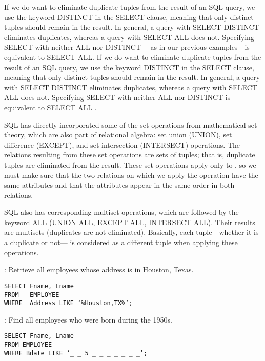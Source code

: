     \par If we do want to eliminate duplicate tuples from the result of an SQL query, we use the keyword DISTINCT in the SELECT clause, meaning that only distinct tuples should remain in the result. In general, a query with SELECT DISTINCT eliminates duplicates, whereas a query with SELECT ALL does not. Specifying SELECT with neither ALL nor DISTINCT —as in our previous examples—is equivalent to SELECT ALL. If we do want to eliminate duplicate tuples from the result of an SQL query, we use the keyword DISTINCT in the SELECT clause, meaning that only distinct tuples should remain in the result. In general, a query with SELECT DISTINCT eliminates duplicates, whereas a query with SELECT ALL does not. Specifying SELECT with neither ALL nor DISTINCT is
equivalent to SELECT ALL .
    \par SQL has directly incorporated some of the set operations from mathematical set
theory, which are also part of relational algebra: set union (UNION), set difference (EXCEPT), and set intersection (INTERSECT) operations. The relations resulting from these set operations are sets of tuples; that is, duplicate tuples are eliminated from the result. These set operations apply only to , so we must make sure that the two relations on which we apply the operation have the same attributes and that the attributes appear in the same order in both relations.
  \par SQL also has corresponding multiset operations, which are followed by the keyword ALL (UNION ALL, EXCEPT ALL, INTERSECT ALL). Their results are multisets (duplicates are not eliminated). Basically, each tuple—whether it is a duplicate or not— is considered as a different tuple when applying these operations.

    \par {}: Retrieve all employees whose address is in Houston, Texas.
      \begin{lstlisting}
SELECT Fname, Lname
FROM   EMPLOYEE
WHERE  Address LIKE ‘%Houston,TX%’;
      \end{lstlisting}
    \par {}: Find all employees who were born during the 1950s.
      \begin{lstlisting}
SELECT Fname, Lname
FROM EMPLOYEE
WHERE Bdate LIKE ‘_ _ 5 _ _ _ _ _ _ _’;
      \end{lstlisting}

